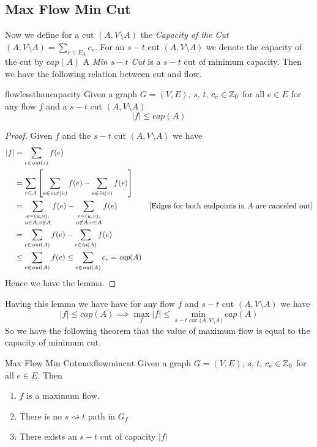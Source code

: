 \subsection{Max Flow Min Cut}
 Now we define for a cut $(A,V\setminus A)$ the \textit{Capacity of the Cut} $(A,V\setminus A)=\sum\limits_{e\in E_A}c_e$. For an $s-t$ cut $(A,V\setminus A)$ we denote the capacity of the cut by $\textit{cap}(A)$ A \textit{Min $s-t$ Cut} is a $s-t$ cut of minimum capacity. Then we have the following relation between cut and flow.
 \begin{lemma}{}{flowlessthancapacity}
 	Given a graph $G=(V,E)$, $s$, $t$, $c_e\in\mathbb{Z}_0$ for all $e\in E$ for any flow $f$ and a $s-t$ cut $(A,V\setminus A)$ $$|f|\leq \textit{cap}(A)$$
 \end{lemma}
\begin{proof}
	Given $f$ and the $s-t$ cut $(A,V\setminus A)$ we have \begin{align*}
		|f| & = \sum_{e\in\textit{out$(s)$}}f(e)\\
		& = \sum_{v\in A}\left[ \sum_{e\in\textit{out(v)}}f(e)-\sum_{e\in \textit{in$(v)$}}f(e)  \right]\\
		& = \sum_{\substack{e=(u,v),\\ u\in A,v\notin A}}f(e) -\sum_{\substack{e=(u,v),\\ u\notin A,v\in A}}f(e) & [\text{Edges for both endpoints in $A$ are canceled out}]\\
		&=\sum_{e\in \textit{out$(A)$}}f(e)-\sum_{e\in \textit{in}(A)}f(e)\\
		& \leq \sum_{e\in \textit{out$(A)$}}f(e)\leq \sum_{e\in \textit{out$(A)$}}c_e=\textit{cap}(A)
	\end{align*}
Hence we have the lemma.
\end{proof}
Having this lemma we have have for any flow $f$ and $s-t$ cut $(A,V\setminus A)$ we have $$|f|\leq \textit{cap$(A)$}\implies \max\limits_f|f|\leq\min\limits_{s-t\textit{ cut $(A,V\setminus A$)}}\textit{cap$(A)$}$$So we have the following theorem that the value of maximum flow is equal to the capacity of minimum cut.
 \begin{Theorem}{Max Flow Min Cut}{maxflowmincut}
 	Given a graph $G=(V,E)$, $s$, $t$, $c_e\in\mathbb{Z}_0$ for all $e\in E$. Then \tfae\begin{enumerate}[label=(\arabic*)]
 		\item $f$ is a maximum flow.
 		\item There is no $s\rightsquigarrow t$ path in $G_f$
 		\item There exists an $s-t$ cut of capacity $|f|$
 	\end{enumerate}
 \end{Theorem}
